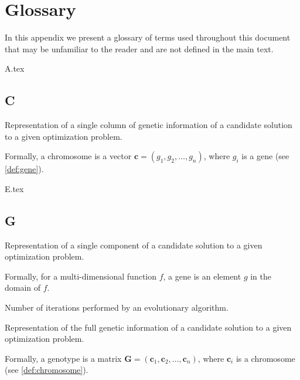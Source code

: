 \chapter{Glossary}
\label{appendix:glossary}
  In this appendix we present a glossary of terms used throughout this document 
  that may be unfamiliar to the reader and are not defined in the main text.

  {A.tex}

  \section*{C}
    \begin{definition}[Chromosome]
    \label{def:chromosome}
      Representation of a single column of genetic information of a candidate solution to a given
      optimization problem.

      Formally, a chromosome is a vector \(\textbf{c} = (g_1, g_2, \dots, g_n)\), where \(g_i\) is a
      gene (see \vref{def:gene}).
    \end{definition}

  {E.tex}
    
  \section*{G}
    \begin{definition}[Gene]
    \label{def:gene}
      Representation of a single component of a candidate solution to a given optimization problem.

      Formally, for a multi-dimensional function \(f\), a gene is an element \(g\) in the domain of
      \(f\).
    \end{definition}

    \begin{definition}[Generation]
    \label{def:generation}
      Number of iterations performed by an evolutionary algorithm.
    \end{definition}

    \begin{definition}[Genotype]
    \label{def:genotype}
      Representation of the full genetic information of a candidate solution to a given optimization
      problem.

      Formally, a genotype is a matrix \(\mathbf{G} = (\textbf{c}_1, \textbf{c}_2, \dots, 
      \textbf{c}_n)\), where \(\textbf{c}_i\) is a chromosome (see \vref{def:chromosome}).
    \end{definition}

